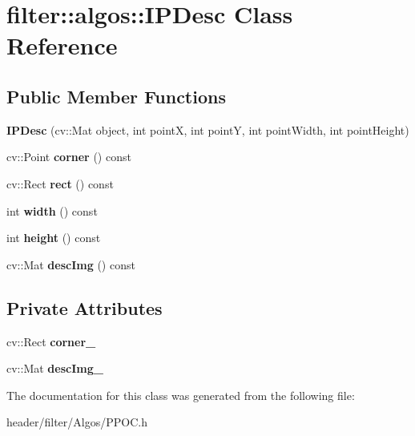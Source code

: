 \hypertarget{classfilter_1_1algos_1_1_i_p_desc}{}\section{filter\+:\+:algos\+:\+:I\+P\+Desc Class Reference}
\label{classfilter_1_1algos_1_1_i_p_desc}
\subsection*{Public Member Functions}
\begin{DoxyCompactItemize}
\item 
\mbox{\label{classfilter_1_1algos_1_1_i_p_desc_a338b99191d2c6d113f5066ee6eb4fb2c}} 
{\bfseries I\+P\+Desc} (cv\+::\+Mat object, int pointX, int pointY, int point\+Width, int point\+Height)
\item 
\mbox{\label{classfilter_1_1algos_1_1_i_p_desc_a77658ad6f018aa44ec183829ad09e8d9}} 
cv\+::\+Point {\bfseries corner} () const
\item 
\mbox{\label{classfilter_1_1algos_1_1_i_p_desc_a31c5f7d3d96b7dc8282b9235303c3fee}} 
cv\+::\+Rect {\bfseries rect} () const
\item 
\mbox{\label{classfilter_1_1algos_1_1_i_p_desc_a4288a962e862ed4f195cece5dee195de}} 
int {\bfseries width} () const
\item 
\mbox{\label{classfilter_1_1algos_1_1_i_p_desc_a496bab19b6b7bad8cbdf68f91315ba2d}} 
int {\bfseries height} () const
\item 
\mbox{\label{classfilter_1_1algos_1_1_i_p_desc_aacb1e157aa650ad40e38b7179e256ce4}} 
cv\+::\+Mat {\bfseries desc\+Img} () const
\end{DoxyCompactItemize}
\subsection*{Private Attributes}
\begin{DoxyCompactItemize}
\item 
\mbox{\label{classfilter_1_1algos_1_1_i_p_desc_a07ee01efcc59d57830508dcd92ec0602}} 
cv\+::\+Rect {\bfseries corner\+\_\+}
\item 
\mbox{\label{classfilter_1_1algos_1_1_i_p_desc_a84b26d0f28a676142bf9f561d066d99e}} 
cv\+::\+Mat {\bfseries desc\+Img\+\_\+}
\end{DoxyCompactItemize}


The documentation for this class was generated from the following file\+:\begin{DoxyCompactItemize}
\item 
header/filter/\+Algos/P\+P\+O\+C.\+h\end{DoxyCompactItemize}

